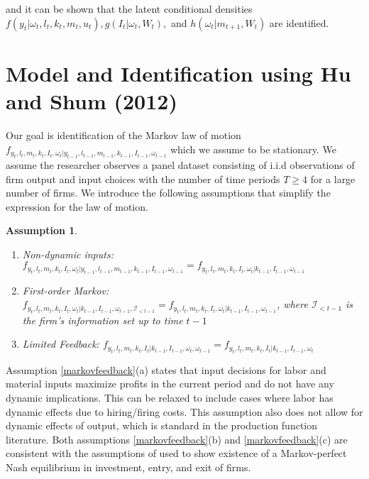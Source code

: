 \documentclass{article}
\newtheorem{assump}{Assumption}[subsection]
\begin{document}
\cite{Hu2008} and \cite{Hu2019} it can be shown that the latent conditional densities $f(y_{t}|\omega_{t}, l_{t}, k_{t}, m_{t}, u_{t}), g(I_{t}|\omega_{t}, W_{t}),$ and $h(\omega_{t}|m_{t+1}, W_{t})$ are identified.

\section{Model and Identification using Hu and Shum (2012)}

Our goal is identification of the Markov law of motion $f_{y_{t}, l_{t}, m_{t}, k_{t}, I_{t}, \omega_{t}|y_{t-1}, l_{t-1}, m_{t-1}, k_{t-1}, I_{t-1}, \omega_{t-1}}$ which we assume to be stationary. We assume the researcher observes a panel dataset consisting of i.i.d observations of firm output and input choices with the number of time periods $T\geq 4$ for a large number of firms. We introduce the following assumptions that simplify the expression for the law of motion. 

\begin{assump}\label{markovfeedback}
~
    \begin{enumerate}[label=\alph*)]
        \item \textit{Non-dynamic inputs:} $f_{y_{t}, l_{t}, m_{t}, k_{t}, I_{t}, \omega_{t}|y_{t-1}, l_{t-1}, m_{t-1}, k_{t-1}, I_{t-1}, \omega_{t-1}}=f_{y_{t}, l_{t}, m_{t}, k_{t}, I_{t}, \omega_{t}|k_{t-1}, I_{t-1}, \omega_{t-1}}$
        \item \textit{First-order Markov:} $f_{y_{t}, l_{t}, m_{t}, k_{t}, I_{t}, \omega_{t}|k_{t-1}, I_{t-1}, \omega_{t-1}, \mathcal{I}_{<t-1}}=f_{y_{t}, l_{t}, m_{t}, k_{t}, I_{t}, \omega_{t}|k_{t-1}, I_{t-1}, \omega_{t-1}}$, where $\mathcal{I}_{<t-1}$ is the firm's information set up to time $t-1$
        \item \textit{Limited Feedback:} $f_{y_{t}, l_{t}, m_{t}, k_{t}, I_{t}|k_{t-1}, I_{t-1}, \omega_{t}, \omega_{t-1}}=f_{y_{t}, l_{t}, m_{t}, k_{t}, I_{t}|k_{t-1}, I_{t-1}, \omega_{t}}$ 
    \end{enumerate}
\end{assump}

Assumption \eqref{markovfeedback}(a) states that input decisions for labor and material inputs maximize profits in the current period and do not have any dynamic implications. This can be relaxed to include cases where labor has dynamic effects due to hiring/firing costs. This assumption also does not allow for dynamic effects of output, which is standard in the production function literature. Both assumptions \eqref{markovfeedback}(b) and \eqref{markovfeedback}(c) are consistent with the assumptions of \cite{Ericson1995} used to show existence of a Markov-perfect Nash equilibrium in investment, entry, and exit of firms.\\
\end{document}
